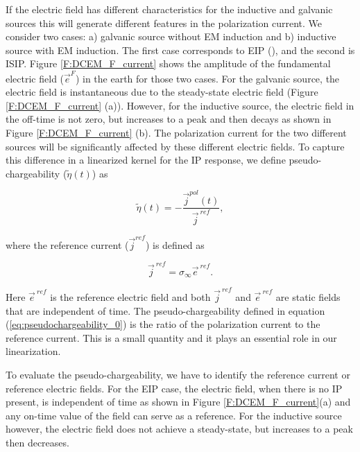 \documentclass[extra,mreferee]{gji}
\newcommand{\siginf}{\sigma_\infty}
\renewcommand {\j}  { {\vec j} }
\newcommand {\e}  { {\vec e} }
\newcommand{\peta}{\tilde{\eta}}
\newcommand{\eref}{\e^{\ ref}}
\begin{document}
If the electric field has different characteristics for the inductive and galvanic sources this will generate different features in the polarization current.  
We consider two cases: a) galvanic source without EM induction and b) inductive source with EM induction. The first case corresponds to EIP (\cite{seigel1959}), and the second is ISIP.
Figure \ref{F:DCEM_F_current} shows the amplitude of the fundamental electric field ($\e^{F}$) in the earth for those two cases. 
For the galvanic source, the electric field is instantaneous due to the steady-state electric field (Figure \ref{F:DCEM_F_current} (a)). 
However, for the inductive source, the electric field in the off-time is not zero, but increases to a peak and then decays as shown in Figure \ref{F:DCEM_F_current} (b). 
The polarization current for the two different sources will be significantly affected by these different electric fields. 
To capture this difference in a linearized kernel for the IP response, we define pseudo-chargeability ($\peta(t)$) as 
\begin{linenomath*}
\begin{equation}
  \peta(t) = -\frac{\j^{pol}(t)}{\j^{\ ref}},
  \label{eq:pseudochargeability_0}
\end{equation}
\end{linenomath*}
where the reference current ($\j^{ref}$) is defined as 
\begin{linenomath*}
\begin{equation}
  \j^{\ ref} = \siginf \eref.
  \label{eq:reference_current}
\end{equation}
\end{linenomath*}
Here $\eref$ is the reference electric field and both $\j^{\ ref}$ and $\eref$ are static fields that are independent of time. 
The pseudo-chargeability defined in equation (\ref{eq:pseudochargeability_0})  is the ratio of  the polarization current to the reference current. This is a small quantity and it plays an essential role in our linearization. 

To evaluate the pseudo-chargeability, we have to identify the reference current or reference electric fields. For the EIP case, the electric field, when there is no IP present, is independent of time as shown in Figure \ref{F:DCEM_F_current}(a) and any on-time value of the field can serve as a reference. For the inductive source however, the electric field does not achieve a steady-state, but increases to a  peak then decreases. 

\end{document}
